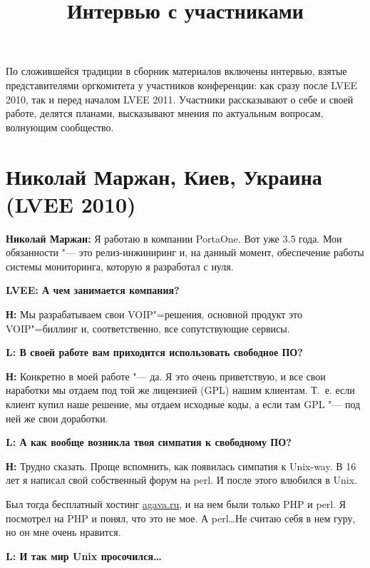 \documentclass[10pt, a5paper]{article}
\begin{document}
\title{Интервью с участниками}
\date{}
\maketitle

По сложившейся традиции в сборник материалов включены интервью, взятые представителями оргкомитета у участников конференции: как сразу после LVEE 2010, так и перед началом LVEE 2011. Участники рассказывают о себе и своей работе, делятся планами, высказывают мнения по актуальным вопросам, волнующим сообщество. 

\section{Николай Маржан, Киев, Украина (LVEE 2010)}

{\noindent \bf Николай Маржан:} Я работаю в компании PortaOne. Вот уже 3.5 года. Мои обязанности "--- это релиз-инжиниринг и, на данный момент, обеспечение работы системы мониторинга, которую я разработал с нуля.

{\noindent \bf LVEE: А чем занимается компания?}

{\noindent \bf Н:} Мы разрабатываем свои VOIP"=решения, основной продукт это VOIP"=биллинг и, соответственно, все сопутствующие сервисы.

{\noindent \bf L: В своей работе вам приходится использовать свободное ПО?}

{\noindent \bf Н:} Конкретно в моей работе "--- да. Я это очень приветствую, и все свои наработки мы отдаем под той же лицензией (GPL) нашим клиентам. Т.~е. если клиент купил наше решение, мы отдаем исходные коды, а если там GPL "--- под ней же свои доработки.

{\noindent \bf L: А как вообще возникла твоя симпатия к свободному ПО?}

{\noindent \bf Н:} Трудно сказать. Проще вспомнить, как появилась симпатия к Unix-way. В 16 лет я написал свой собственный форум на perl. И после этого влюбился в Unix. 

Был тогда бесплатный хостинг \url{agava.ru}, и на нем были только PHP и perl. Я посмотрел на PHP и понял, что это не мое. А perl\ldots Не считаю себя в нем гуру, но он мне очень нравится. 

{\noindent \bf L: И так мир Unix просочился\ldots}
\end{document}

